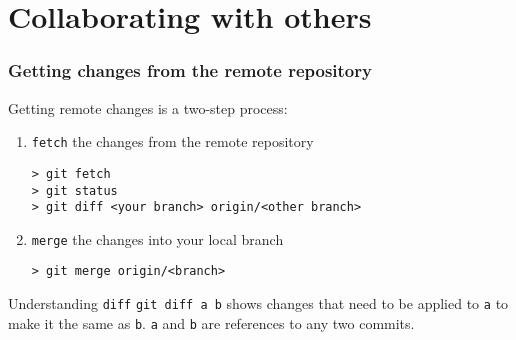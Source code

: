 \section{Collaborating with others}



\begin{frame}[fragile]
	\frametitle{Getting changes from the remote repository}
	
	Getting remote changes is a two-step process:
	\begin{enumerate}
		\item \texttt{fetch} the changes from the remote repository
	\begin{verbatim}
> git fetch
> git status
> git diff <your branch> origin/<other branch>
	\end{verbatim}
		\item \texttt{merge} the changes into your local branch
	\begin{verbatim}
> git merge origin/<branch>
	\end{verbatim}
	\end{enumerate}
	
	\begin{block}{Understanding \texttt{diff}}
	\texttt{git diff a b} shows changes that need to be applied to \texttt{a} to make it the same as \texttt{b}. \texttt{a} and \texttt{b} are references to any two commits.
	\end{block}
	
\end{frame}


